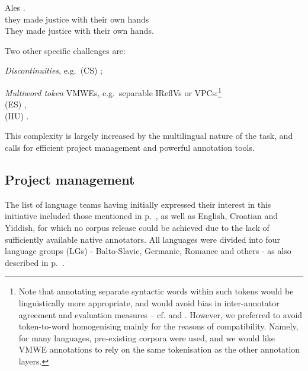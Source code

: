 \documentclass[output=paper,
modfonts,
]{langscibook}
\begin{document}
\begin{sitem}
\begin{sitem}
\ea \label{pt:take-into-hands}
\settowidth {}
\gll Ales      . \\
they made justice with their own hands\\ 
\glt They made justice with their own hands. 
\z

    \end{sitem}
\end{sitem}
Two other specific challenges are:
\begin{sitem}
\item \emph{Discontinuities}, e.g.\ (CS) ;
\item \emph{Multiword token} VMWEs, e.g.\ separable IReflVs or VPCs:\footnote{Note that annotating separate syntactic words within such tokens would be linguistically more appropriate, and would avoid bias in inter-annotator agreement and evaluation measures -- cf.  and \citep{MWEWorkshop}. However, we preferred to avoid token-to-word homogenising mainly for the reasons of compatibility. Namely, for many languages, pre-existing corpora were used, and we would like VMWE annotations to rely on the same tokenisation as the other annotation layers.}\\ (ES) ,\\ (HU) .%

\end{sitem}

\noindent
This complexity is largely increased by the multilingual nature of the task, and calls for efficient project management and powerful annotation tools. 

\subsection{Project management}
\label{sec:management}
%
The list of language teams having initially expressed their interest in this initiative included those mentioned in p.~\pageref{language-groups}, as well as English, Croatian and Yiddish, for which no corpus release could be achieved due to the lack of sufficiently available native annotators. All languages were divided into four language groups (LGs) - Balto-Slavic, Germanic, Romance and others - as also described in p.~\pageref{language-groups}.
\end{document}
